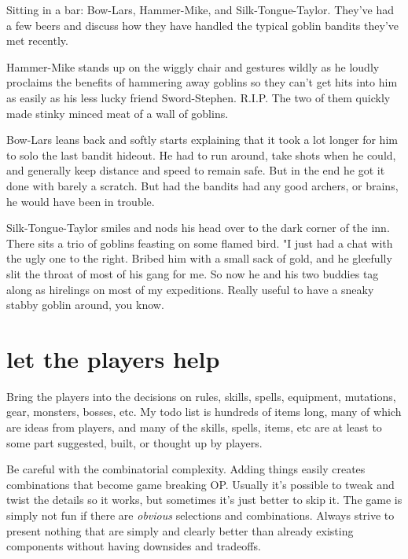 \begin{readoutloud}
Sitting in a bar: Bow-Lars, Hammer-Mike, and Silk-Tongue-Taylor. They've had a few beers and discuss how they have handled the typical goblin bandits they've met recently. 

Hammer-Mike stands up on the wiggly chair and gestures wildly as he loudly proclaims the benefits of hammering away goblins so they can't get hits into him as easily as his less lucky friend Sword-Stephen. R.I.P. The two of them quickly made stinky minced meat of a wall of goblins.

Bow-Lars leans back and softly starts explaining that it took a lot longer for him to solo the last bandit hideout. He had to run around, take shots when he could, and generally keep distance and speed to remain safe. But in the end he got it done with barely a scratch. But had the bandits had any good archers, or brains, he would have been in trouble.

Silk-Tongue-Taylor smiles and nods his head over to the dark corner of the inn. There sits a trio of goblins feasting on some flamed bird. "I just had a chat with the ugly one to the right. Bribed him with a small sack of gold, and he gleefully slit the throat of most of his gang for me. So now he and his two buddies tag along as hirelings on most of my expeditions. Really useful to have a sneaky stabby goblin around, you know.
\end{readoutloud}

\section*{let the players help}
Bring the players into the decisions on rules, skills, spells, equipment, mutations, gear, monsters, bosses, etc. My todo list is hundreds of items long, many of which are ideas from players, and many of the skills, spells, items, etc are at least to some part suggested, built, or thought up by players.

Be careful with the combinatorial complexity. Adding things easily creates combinations that become game breaking OP. Usually it's possible to tweak and twist the details so it works, but sometimes it's just better to skip it. The game is simply not fun if there are \emph{obvious} selections and combinations. Always strive to present nothing that are simply and clearly better than already existing components without having downsides and tradeoffs.






